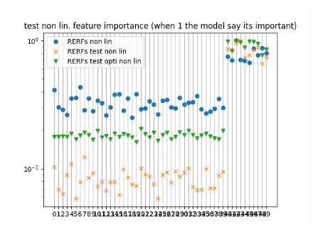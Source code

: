 \documentclass{article}
\begin{document}
\newpage
\begin{figure}

\includegraphics[scale=1]{test_non_linear_feature_importance.png}
\end{figure}
\end{document}
